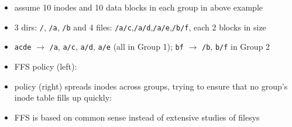 \begin{itemize}
\item assume 10 inodes and 10 data blocks in each group in above example
\item 3 dirs: \texttt{/}, \texttt{/a}, \texttt{/b} and 4 files: \texttt{/a/c},\texttt{/a/d},\texttt{/a/e},\texttt{/b/f}, each 2 blocks in size
\item \texttt{acde} $\to$ \texttt{/a}, \texttt{a/c}, \texttt{a/d}, \texttt{a/e} (all in Group 1); \texttt{bf} $\to$ \texttt{/b}, \texttt{b/f} in Group 2
\item FFS policy (left):
\item policy (right) spreads inodes across groups, trying to ensure that no group’s inode table fills up quickly:
\item FFS is based on common sense instead of extensive studies of filesys
\end{itemize}
